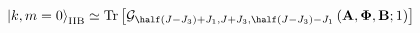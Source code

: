 \begin{equation}
\left| k, m=0 \right>_{\mathrm{IIB}} \simeq \mathrm{Tr} \left[ 
             \mathcal{G}_{\half (J-J_3) + J_1,J + J_3,\half (J-J_3) - J_1} 
                \left( \mathbf{A}, \mathbf{\Phi}, \mathbf{B}; 1 \right) 
                    \right]
\end{equation}


